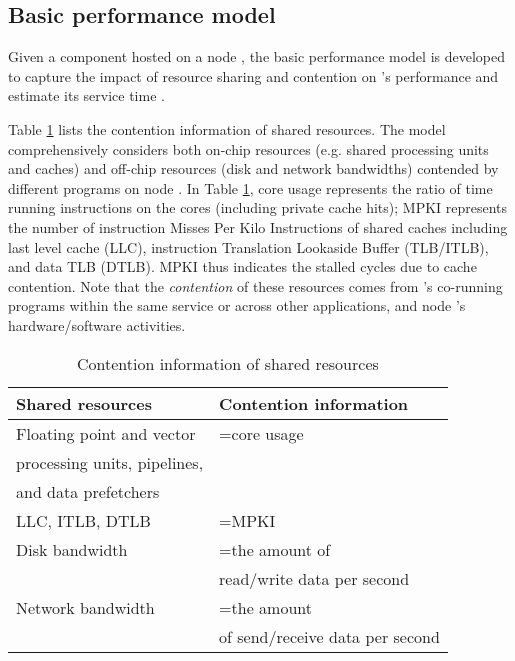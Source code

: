 \documentclass[10pt, conference, compsocconf]{IEEEtran}
\begin{document}
\subsection{Basic performance model} \label{Section: Basic performance model}

Given a component  hosted on a node , the basic performance model is developed to capture the impact of resource sharing and contention on 's performance and estimate its service time .

Table \ref{table: Usage information of shared resources} lists the contention information of shared resources. The model comprehensively considers both on-chip resources (e.g. shared processing units and caches) and off-chip resources (disk and network bandwidths) contended by different programs on node . In Table \ref{table: Usage information of shared resources}, core usage represents the ratio of time running instructions on the cores (including private cache hits); MPKI represents the number of instruction Misses Per Kilo Instructions of shared caches including last level cache (LLC), instruction Translation Lookaside Buffer (TLB/ITLB), and data TLB (DTLB). MPKI thus indicates the stalled cycles due to cache contention. Note that the \emph{contention} of these resources comes from 's co-running programs within the same service or across other applications, and node 's hardware/software activities.















\begin{table}[h!]
  \caption{Contention information of shared resources}
  \centering
  \begin{tabular}{|l|l|}
    \hline
    \textbf{Shared resources} & \textbf{Contention information} \\
    \hline
    Floating point and vector  & =core usage\\
    processing units, pipelines,& \\
    and data prefetchers & \\
    \hline
    LLC, ITLB, DTLB & =MPKI\\
    \hline
    Disk bandwidth & =the amount of \\
    & read/write data per second \\
    \hline
    Network bandwidth & =the amount \\
    & of send/receive data per second  \\
    \hline
  \end{tabular}
  \label{table: Usage information of shared resources}
\end{table}
\end{document}
